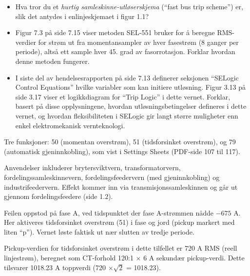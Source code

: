 \begin{itemize}
\item{} Hva tror du et {\it hurtig samleskinne-utløserskjema} (``fast bus trip scheme'') er, slik det antydes i enlinjeskjemaet i figur 1.1?
\item{} Figur 7.3 på side 7.15 viser metoden SEL-551 bruker for å beregne RMS-verdier for strøm ut fra momentansampler av hver fasestrøm (8 ganger per periode), altså ett sample hver 45. grad av fasorrotasjon. Forklar hvordan denne metoden fungerer.
\item{} I siste del av hendelsesrapporten på side 7.13 definerer seksjonen ``SELogic Control Equations'' hvilke variabler som kan initiere utløsning. Figur 3.13 på side 3.17 viser et logikkdiagram for ``Trip Logic'' i dette vernet. Forklar, basert på disse opplysningene, hvordan utløsningsbetingelser defineres i dette vernet, og hvordan fleksibiliteten i SELogic gir langt større muligheter enn enkel elektromekanisk vernteknologi.
\end{itemize}















Tre funksjoner: 50 (momentan overstrøm), 51 (tidsforsinket overstrøm), og 79 (automatisk gjeninnkobling), som vist i Settings Sheets (PDF-side 107 til 117).



\vskip 10pt

Anvendelser inkluderer brytersviktvern, transformatorvern, fordelingssamleskinnevern, fordelingsfeedervern (med gjeninnkobling) og industrifeedervern. Effekt kommer inn via transmisjonssamleskinnen og går ut gjennom fordelingsfeedere (side 1.2).

\vskip 10pt

Feilen oppstod på fase A, ved tidspunktet der fase A-strømmen nådde $-675$ A. Her aktiveres tidsforsinket overstrøm (51) i fase og jord (pickup markert med liten ``p''). Vernet løste faktisk ut nær slutten av tredje periode.

\vskip 10pt

Pickup-verdien for tidsforsinket overstrøm i dette tilfellet er 720 A RMS (reell linjestrøm), beregnet som CT-forhold 120:1 $\times$ 6 A sekundær pickup-verdi. Dette tilsvarer 1018.23 A toppverdi (720 $\times \sqrt{2}$ = 1018.23).

